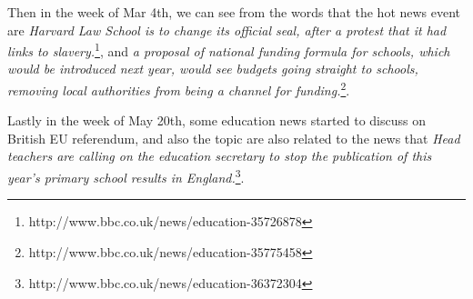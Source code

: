 Then in the week of Mar 4th, we can see from the words that the hot news event are \textit{Harvard Law School is to change its official seal, after a protest that it had links to slavery.}\footnote{http://www.bbc.co.uk/news/education-35726878}, and \textit{a proposal of national funding formula for schools, which would be introduced next year, would see budgets going straight to schools, removing local authorities from being a channel for funding.}\footnote{http://www.bbc.co.uk/news/education-35775458}. 

Lastly in the week of May 20th, some education news started to discuss on British EU referendum, and also the topic are also related to the news that \textit{Head teachers are calling on the education secretary to stop the publication of this year's primary school results in England.}\footnote{http://www.bbc.co.uk/news/education-36372304}. 


